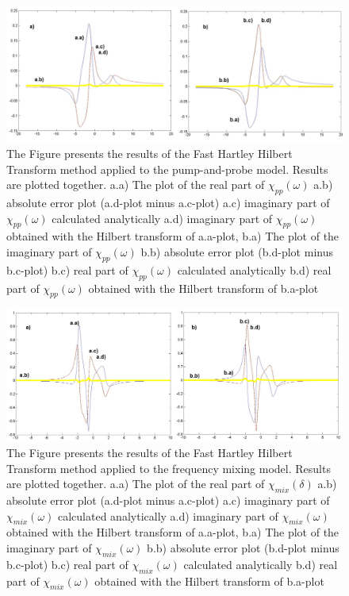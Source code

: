 \documentclass[12pt,twoside,a4paper]{article}
\numberwithin{equation}{subsection}
\numberwithin{figure}{subsection}
\begin{document}
\begin{figure} 
  \includegraphics[width=150mm]{img/fht_pnp.png}
  \caption{The Figure presents the results of the Fast Hartley Hilbert Transform method applied to the pump-and-probe model. Results are
  plotted together.
     a.a) The plot of the real part of ${\chi_{pp}}(\omega )$
     a.b) absolute error plot (a.d-plot minus a.c-plot) 
     a.c) imaginary part of $\chi_{pp}(\omega )$ calculated analytically 
     a.d) imaginary part of $\chi_{pp}(\omega )$ obtained with the Hilbert transform of a.a-plot, 
     b.a) The plot of the imaginary part of $\chi_{pp}(\omega )$ 
     b.b) absolute error plot (b.d-plot minus b.c-plot) 
     b.c) real part of $\chi_{pp} (\omega )$ calculated analytically 
     b.d) real part of $\chi_{pp} (\omega )$ obtained with the Hilbert transform of b.a-plot 
     \label{fig:fht_pnp}
     }
\end{figure} 

\begin{figure} 
  \includegraphics[width=150mm]{img/fht_fmix.png}
  \caption{The Figure presents the results of the Fast Hartley Hilbert Transform method applied to the frequency mixing model. Results are
  plotted together.
     a.a) The plot of the real part of ${\chi_{mix}}(\delta )$
     a.b) absolute error plot (a.d-plot minus a.c-plot) 
     a.c) imaginary part of $\chi_{mix}(\omega )$ calculated analytically 
     a.d) imaginary part of $\chi_{mix}(\omega )$ obtained with the Hilbert transform of a.a-plot, 
     b.a) The plot of the imaginary part of $\chi_{mix}(\omega )$ 
     b.b) absolute error plot (b.d-plot minus b.c-plot) 
     b.c) real part of $\chi_{mix} (\omega )$ calculated analytically 
     b.d) real part of $\chi_{mix} (\omega )$ obtained with the Hilbert transform of b.a-plot 
     \label{fig:fht_fmix}
     }
\end{figure}
\end{document}
